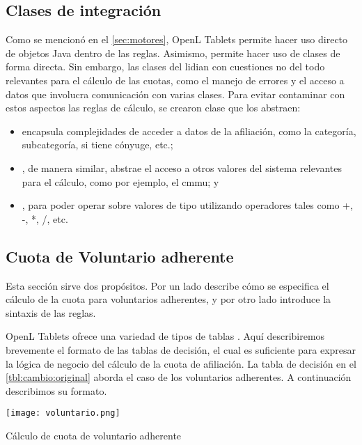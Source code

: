 \subsection{Clases de integración}\label{ssec:integracion:clases}

Como se mencionó en el \cref{sec:motores}, OpenL Tablets permite hacer uso directo de objetos Java dentro de las reglas.
Asimismo, permite hacer uso de clases de forma directa.
Sin embargo, las clases del {\SIDOSPU} lidian con cuestiones no del todo relevantes para el cálculo de las cuotas, como el manejo de errores y el acceso a datos que involucra comunicación con varias clases.
Para evitar contaminar con estos aspectos las reglas de cálculo, se crearon clase que los abstraen:
\begin{itemize}
    \item {} encapsula complejidades de acceder a datos de la afiliación, como la categoría, subcategoría, si tiene cónyuge, etc.;
    \item {}, de manera similar, abstrae el acceso a otros valores del sistema relevantes para el cálculo, como por ejemplo, el \acrshort{cmmu}; y
    \item {}, para poder operar sobre valores de tipo  utilizando operadores tales como +, -, *, /, etc.
\end{itemize}

\subsection{Cuota de Voluntario adherente}

Esta sección sirve dos propósitos.
Por un lado describe cómo se especifica el cálculo de la cuota para voluntarios adherentes, y por otro lado introduce la sintaxis de las reglas.

OpenL Tablets ofrece una variedad de tipos de tablas \cite{openl}.
Aquí describiremos brevemente el formato de las tablas de decisión, el cual es suficiente para expresar la lógica de negocio del cálculo de la cuota de afiliación.
%
La tabla de decisión en el \cref{tbl:cambio:original} aborda el caso de los voluntarios adherentes.
A continuación describimos su formato.

\begin{table*}[h]
    \centering
    \texttt{[image: voluntario.png]}
    \caption{Cálculo de cuota de voluntario adherente}
    \label{tbl:cambio:original}
\end{table*}

